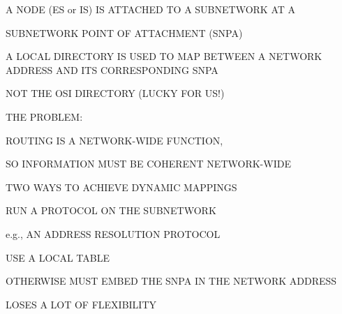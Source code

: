 \begin{bwslide}

\begin{nrtc}
\item	A NODE (ES or IS) IS ATTACHED TO A SUBNETWORK AT A
    \begin{nrtc}
    \item	SUBNETWORK POINT OF ATTACHMENT (SNPA)
    \end{nrtc}

\item	A LOCAL DIRECTORY IS USED TO MAP BETWEEN A NETWORK ADDRESS
	AND ITS CORRESPONDING SNPA
    \begin{nrtc}
    \item	NOT THE OSI DIRECTORY (LUCKY FOR US!)    
    \end{nrtc}

\item	THE PROBLEM:
    \begin{nrtc}
    \item	ROUTING IS A NETWORK-WIDE FUNCTION,

    \item	SO INFORMATION MUST BE COHERENT NETWORK-WIDE
    \end{nrtc}
\end{nrtc}
\end{bwslide}


\begin{bwslide}

\begin{nrtc}
\item	TWO WAYS TO ACHIEVE DYNAMIC MAPPINGS

\item	RUN A PROTOCOL ON THE SUBNETWORK
    \begin{nrtc}
    \item	e.g., AN ADDRESS RESOLUTION PROTOCOL
    \end{nrtc}

\item	USE A LOCAL TABLE

\item	OTHERWISE MUST EMBED THE SNPA IN THE NETWORK ADDRESS
    \begin{nrtc}
    \item	LOSES A LOT OF FLEXIBILITY
    \end{nrtc}
\end{nrtc}
\end{bwslide}


